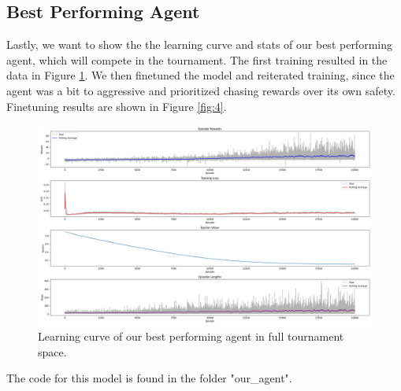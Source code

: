 \documentclass{article} %
\begin{document}
	\subsection{Best Performing Agent}
	Lastly, we want to show the the learning curve and stats of our best performing agent, which will compete in the tournament. 
	The first training resulted in the data in Figure \ref{fig:5}. We then finetuned the model and reiterated training, since the agent was a bit to aggressive and prioritized chasing rewards over its own safety. Finetuning results are shown in Figure \ref{fig:4}.
		\begin{figure}[h!]
		\centering
		\includegraphics[width=1.0\textwidth]{images/best_training_results}
		\caption{Learning curve of our best performing agent in full tournament space.}
		\label{fig:5}
	\end{figure}
	
	The code for this model is found in the folder "our\_agent".
	
	
	
\end{document}
